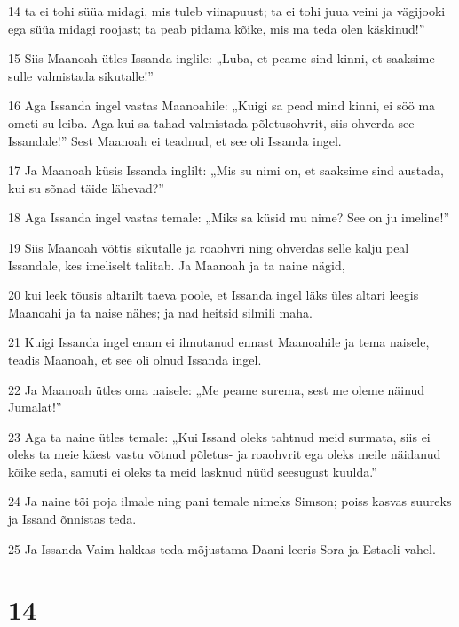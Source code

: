 \par 14 ta ei tohi süüa midagi, mis tuleb viinapuust; ta ei tohi juua veini ja vägijooki ega süüa midagi roojast; ta peab pidama kõike, mis ma teda olen käskinud!”
\par 15 Siis Maanoah ütles Issanda inglile: „Luba, et peame sind kinni, et saaksime sulle valmistada sikutalle!”
\par 16 Aga Issanda ingel vastas Maanoahile: „Kuigi sa pead mind kinni, ei söö ma ometi su leiba. Aga kui sa tahad valmistada põletusohvrit, siis ohverda see Issandale!” Sest Maanoah ei teadnud, et see oli Issanda ingel.
\par 17 Ja Maanoah küsis Issanda inglilt: „Mis su nimi on, et saaksime sind austada, kui su sõnad täide lähevad?”
\par 18 Aga Issanda ingel vastas temale: „Miks sa küsid mu nime? See on ju imeline!”
\par 19 Siis Maanoah võttis sikutalle ja roaohvri ning ohverdas selle kalju peal Issandale, kes imeliselt talitab. Ja Maanoah ja ta naine nägid,
\par 20 kui leek tõusis altarilt taeva poole, et Issanda ingel läks üles altari leegis Maanoahi ja ta naise nähes; ja nad heitsid silmili maha.
\par 21 Kuigi Issanda ingel enam ei ilmutanud ennast Maanoahile ja tema naisele, teadis Maanoah, et see oli olnud Issanda ingel.
\par 22 Ja Maanoah ütles oma naisele: „Me peame surema, sest me oleme näinud Jumalat!”
\par 23 Aga ta naine ütles temale: „Kui Issand oleks tahtnud meid surmata, siis ei oleks ta meie käest vastu võtnud põletus- ja roaohvrit ega oleks meile näidanud kõike seda, samuti ei oleks ta meid lasknud nüüd seesugust kuulda.”
\par 24 Ja naine tõi poja ilmale ning pani temale nimeks Simson; poiss kasvas suureks ja Issand õnnistas teda.
\par 25 Ja Issanda Vaim hakkas teda mõjustama Daani leeris Sora ja Estaoli vahel.

\chapter{14}

